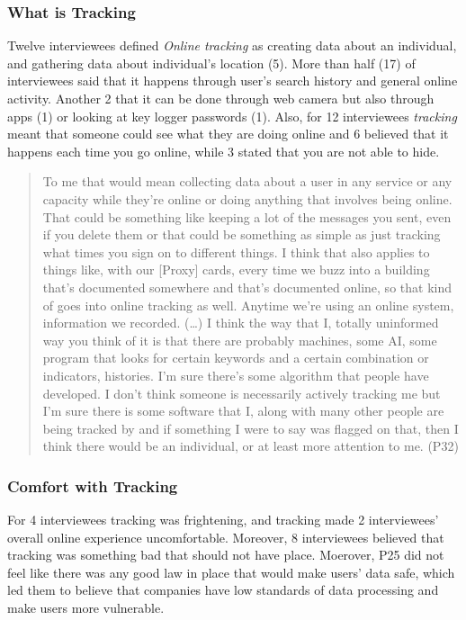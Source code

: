 \subsubsection{What is Tracking}

Twelve interviewees defined \textit{Online tracking} as creating data about an individual, and gathering data about individual's location (5). More than half (17) of interviewees said that it happens through user's search history and general online activity. Another 2 that it can be done through web camera but also through apps (1) or looking at key logger passwords (1). Also, for 12 interviewees  \textit{tracking} meant that someone could see what they are doing online and 6 believed that it happens each time you go online, while 3 stated that you are not able to hide.

\begin{quote}To me that would mean collecting data about a user in any service or any capacity while they're online or doing anything that involves being online. That could be something like keeping a lot of the messages you sent, even if you delete them or that could be something as simple as just tracking what times you sign on to different things. I think that also applies to things like, with our [Proxy] cards, every time we buzz into a building that's documented somewhere and that's documented online, so that kind of goes into online tracking as well. Anytime we're using an online system, information we recorded. (\dots) I think the way that I, totally uninformed way you think of it is that there are probably machines, some AI, some program that looks for certain keywords and a certain combination or indicators, histories. I'm sure there's some algorithm that people have developed. I don't think someone is necessarily actively tracking me but I'm sure there is some software that I, along with many other people are being tracked by and if something I were to say was flagged on that, then I think there would be an individual, or at least more attention to me. (P32)\end{quote}





\subsubsection{Comfort with Tracking}
For 4 interviewees tracking was frightening, and tracking made 2 interviewees' overall online experience uncomfortable. Moreover, 8 interviewees believed that tracking was something bad that should not have place. 
Moerover, P25 did not feel like there was any good law in place that would make users' data safe, which led them to believe that companies have low standards of data processing and make users more vulnerable. 

